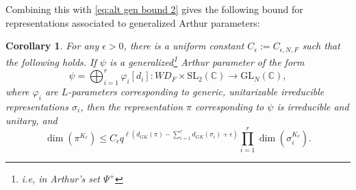 \documentclass{amsart}
\newcommand{\C}{\mathbb C}
\newcommand{\SL}{\mathrm{SL}}
\newcommand{\GL}{\mathrm{GL}}
\newcommand{\eps}{\epsilon}
\newcommand{\1}{\m 1}
\newtheorem{cor}[thm]{Corollary}
\theoremstyle{remark}
\theoremstyle{definition}
\numberwithin{equation}{subsection}
\begin{document}
Combining this with \eqref{eq:alt gen bound 2} gives the following bound for representations associated to generalized Arthur parameters: 


\begin{cor}\label{cor:genboundrel}
For any $\eps > 0$, there is a uniform constant $C_\eps := C_{\eps, N, F}$ such that the following holds.  If $\psi$ is a generalized\footnote{i.e, in Arthur's set $\Psi^+$} Arthur parameter of the form
\[
\psi = \bigoplus_{i=1}^r \varphi_i[d_i]: WD_F \times \SL_2(\C) \to \GL_N(\C),
\]
where $\varphi_i$ are $L$-parameters corresponding to generic, unitarizable irreducible representations $\sigma_i$, then the representation $\pi$ corresponding to $\psi$ is irreducible and unitary, and 
\[
\dim(\pi^{K_\ell}) \leq C_\eps q^{\ell (d_{GK}(\pi) - \sum_{i=1}^r d_{GK}(\sigma_i)+\eps)} \prod_{i=1}^r \dim(\sigma_i^{K_\ell}). 
\]
\end{cor}
\end{document}
